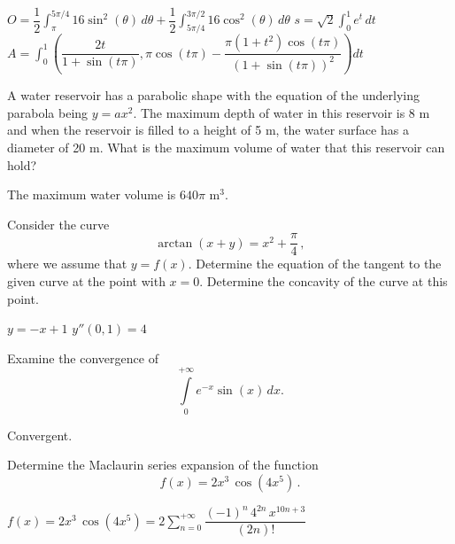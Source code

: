 \begin{Answer}
\Question $\displaystyle O = \dfrac{1}{2} \int_{\pi}^{5\pi/4} 16\sin^2(\theta)\, d\theta + \dfrac{1}{2} \int_{5\pi/4}^{3\pi/2} 16\cos^2(\theta)\, d\theta$    
\Question $\displaystyle s=\sqrt{2}\int_0^1 e^t\, dt$
\Question $A = \displaystyle \int_0^1 \left( \dfrac{2t}{1+\sin(t\pi)} , \pi\cos(t\pi) - \dfrac{\pi(1+t^2)\cos(t\pi)}{(1+\sin(t\pi))^2} \right) dt$
\end{Answer}


\begin{Exercise} A water reservoir has a parabolic shape with the equation of the underlying parabola being $y=ax^2$. The maximum depth of water in this reservoir is 8 m and when the reservoir is filled to a height of 5 m, the water surface has a diameter of 20 m. What is the maximum volume of water that this reservoir can hold?
\end{Exercise}

\begin{Answer}
The maximum water volume is $640\pi$ m$^3$.
\end{Answer}


\begin{Exercise} Consider the curve
$$
\arctan(x+y)=x^2+\dfrac{\pi}{4}\,,
$$
where we assume that $y=f(x)$. 
\Question Determine the equation of the tangent to the given curve at the point with $x=0$. 
\Question Determine the concavity of the curve at this point.
\end{Exercise}

\begin{Answer}
\Question $y=-x+1$
\Question $y''(0,1)=4$
\end{Answer}


\begin{Exercise}  Examine the convergence of
$$
\int\limits_{0}^{+\infty}e^{-x}\sin(x)\, dx.
$$
\end{Exercise}

\begin{Answer}
Convergent.    
\end{Answer}


\begin{Exercise} Determine the Maclaurin series expansion of the function 
$$
f(x)=2x^3\,\cos\left(4x^5\right)\,.
$$
\end{Exercise}

\begin{Answer}
$\displaystyle f(x)=2x^3\,\cos\left(4x^5\right)=2\sum_{n=0}^{+\infty} \dfrac{(-1)^n\, 4^{2n}\, x^{10n+3}}{(2n)!}$    
\end{Answer}


